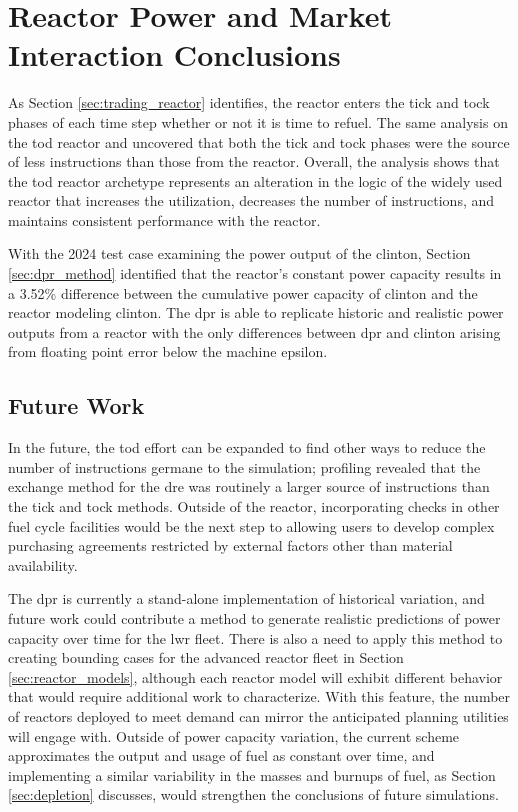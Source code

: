 \section{Reactor Power and Market Interaction Conclusions}

As Section \ref{sec:trading_reactor} identifies, the \cycamore reactor enters the tick and tock phases of each time step whether or not it is time to refuel. The same analysis on the \gls{tod} reactor and uncovered that both the tick and tock phases were the source of less instructions than those from the \cycamore reactor. Overall, the analysis shows that the \gls{tod} reactor archetype represents an alteration in the logic of the widely used \cycamore reactor that increases the utilization, decreases the number of instructions, and maintains consistent performance with the \cycamore reactor.

With the 2024 test case examining the power output of the \gls{clinton}, Section \ref{sec:dpr_method} identified that the \cycamore reactor's constant power capacity results in a 3.52\% difference between the cumulative power capacity of \gls{clinton} and the \cycamore reactor modeling \gls{clinton}. The \gls{dpr} is able to replicate historic and realistic power outputs from a reactor with the only differences between \gls{dpr} and \gls{clinton} arising from floating point error below the machine epsilon.

\subsection{Future Work}
\label{sec:time_future_work}

In the future, the \gls{tod} effort can be expanded to find other ways to reduce the number of instructions germane to the simulation; profiling revealed that the exchange method for the \gls{dre} was routinely a larger source of instructions than the tick and tock methods. Outside of the reactor, incorporating checks in other fuel cycle facilities would be the next step to allowing users to develop complex purchasing agreements restricted by external factors other than material availability.

The \gls{dpr} is currently a stand-alone implementation of historical variation, and future work could contribute a method to generate realistic predictions of power capacity over time for the \gls{lwr} fleet. There is also a need to apply this method to creating bounding cases for the advanced reactor fleet in Section \ref{sec:reactor_models}, although each reactor model will exhibit different behavior that would require additional work to characterize. With this feature, the number of reactors deployed to meet demand can mirror the anticipated planning utilities will engage with. Outside of power capacity variation, the current scheme approximates the output and usage of fuel as constant over time, and implementing a similar variability in the masses and burnups of fuel, as Section \ref{sec:depletion} discusses, would strengthen the conclusions of future \cyclus simulations.


